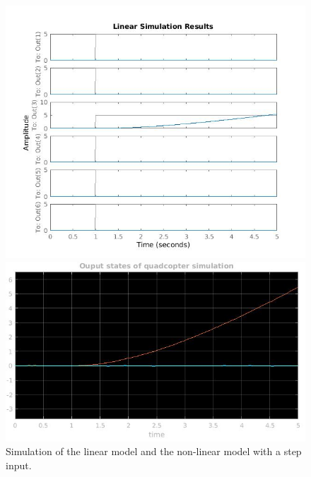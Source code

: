 \documentclass[]{article}
\begin{document}
\begin{figure}[H]
\begin{minipage}{.5\textwidth}
\includegraphics[width=\textwidth]{lsimresult.jpg}
\end{minipage}%
\begin{minipage}{.5\textwidth}
\includegraphics[width=\textwidth]{quadcoptersimresult.jpg}
\end{minipage}
\caption{Simulation of the linear model and the non-linear model with a step input.}
\end{figure}
\end{document}
